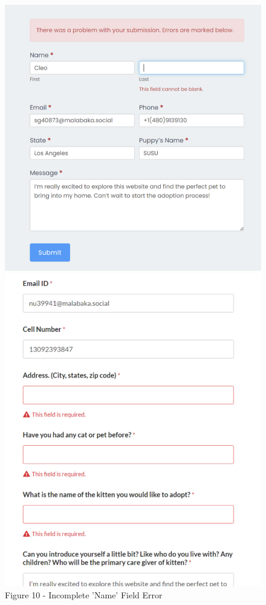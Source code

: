 \documentclass[ oneside,%
                    author={Cassie Qing Tang},
                    degree={BSc},
                     title={An Automated Response System for Disrupting Online Pet Scamming \\ },
                    subtitle={ }]{dissertation}
\begin{document}
\begin{figure}[H]
    \centering
    \begin{minipage}{0.45\textwidth}
        \includegraphics[width=\linewidth]{pic/figure10.png}
        \caption{Figure 10 - Incomplete 'Name' Field Error}
    \end{minipage}
    \hfill 
    \begin{minipage}{0.45\textwidth}\ContinuedFloat
        \includegraphics[width=\linewidth, height=0.3\textheight]{pic/figure11.png}

\end{minipage}
\end{figure}
\end{document}

